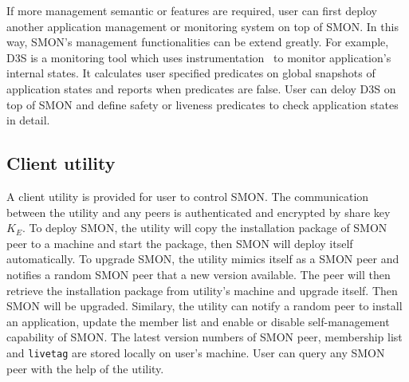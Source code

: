 If more management semantic or features are required, user
can first deploy another application management or
monitoring system on top of SMON. In this way, SMON's
management functionalities can be extend greatly. For
example, D3S is a monitoring tool which uses
instrumentation~\cite{xx} to monitor application's internal
states. It calculates user specified predicates on global
snapshots of application states and reports when predicates
are false. User can deloy D3S on top of SMON and define
safety or liveness predicates to check application states in
detail.


\subsection{Client utility}
\label{subsec:client}

A client utility is provided for user to control SMON. The
communication between the utility and any peers is
authenticated and encrypted by share key $K_E$. To deploy
SMON, the utility will copy the installation package of SMON
peer to a machine and start the package, then SMON will
deploy itself automatically. To upgrade SMON, the utility
mimics itself as a SMON peer and notifies a random SMON peer
that a new version available.  The peer will then retrieve
the installation package from utility's machine and upgrade
itself. Then SMON will be upgraded.  Similary, the utility
can notify a random peer to install an application, update
the member list and enable or disable self-management
capability of SMON. The latest version numbers of SMON peer,
membership list and \texttt{livetag} are stored locally on
user's machine.  User can query any SMON peer with the help
of the utility.






